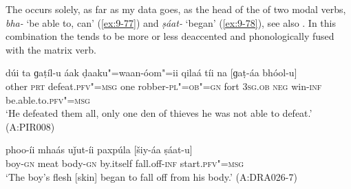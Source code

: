 The  occurs solely, as far as my data goes, as the head of the  of two modal
verbs, \textit{bha-} `be able to, can' (\ref{ex:9-77}) and \textit{ṣáat-} `began' (\ref{ex:9-78}), see also
. In this combination the  tends to be more or less deaccented and phonologically
fused with the matrix   verb.

\begin{exe}
\ex
\label{ex:9-77}
\gll dúi ta ɡaṭíl-u áak ḍaaku"=waan-óom"=ii qilaá tíi na [ɡaṭ-áa bhóol-u]  \\
other \textsc{prt} defeat.\textsc{pfv"=msg} one robber-\textsc{pl"=ob"=gn}  fort \textsc{3sg.ob} \textsc{neg} win-\textsc{inf} be.able.to.\textsc{pfv"=msg} \\
\glt `He defeated them all, only one den of thieves he was not able to defeat.' (A:PIR008)

\ex
\label{ex:9-78}
\gll phoo-íi mhaás uǰut-íi paxpúla [šiy-áa ṣáat-u] \\
boy-\textsc{gn} meat body-\textsc{gn} by.itself fall.off-\textsc{inf} start.\textsc{pfv"=msg} \\
\glt `The boy's flesh [skin] began to fall off from his body.' (A:DRA026-7) 
\end{exe}